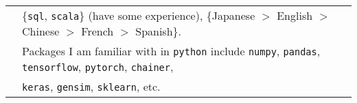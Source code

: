 \documentclass[utf8,letterpaper,oneside]{article}
\begin{document}
\begin{center}
\begin{tabular}{l l}
                           & \{\texttt{sql}, \texttt{scala}\} (have some experience), \{Japanese $>$ English $>$ Chinese $>$ French $>$ Spanish\}.                            \\
                           & Packages I am familiar with in \texttt{python} include \texttt{numpy}, \texttt{pandas}, \texttt{tensorflow}, \texttt{pytorch}, \texttt{chainer}, \\
                           & \texttt{keras}, \texttt{gensim}, \texttt{sklearn}, etc.                                                                                          
 \end{tabular}
\end{center}
\end{document}
